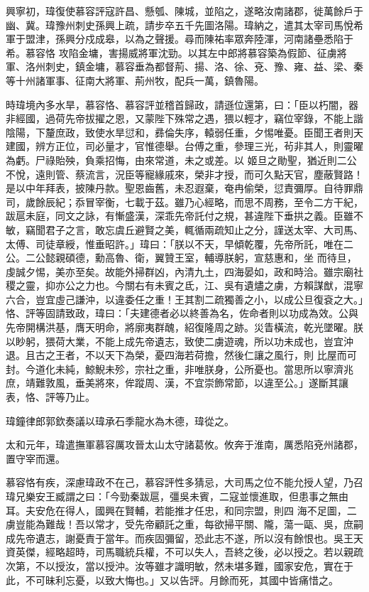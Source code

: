 \begin{pinyinscope}
 興寧初，瑋復使慕容評寇許昌、懸瓠、陳城，並陷之，遂略汝南諸郡，徙萬餘戶于幽、冀。瑋豫州刺史孫興上疏，請步卒五千先圖洛陽。瑋納之，遣其太宰司馬悅希軍于盟津，孫興分戍成皋，以為之聲援。尋而陳祐率眾奔陸渾，河南諸壘悉陷于希。慕容恪
 攻陷金墉，害揚威將軍沈勁。以其左中郎將慕容築為假節、征虜將軍、洛州刺史，鎮金墉，慕容垂為都督荊、揚、洛、徐、兗、豫、雍、益、梁、秦等十州諸軍事、征南大將軍、荊州牧，配兵一萬，鎮魯陽。



 時瑋境內多水旱，慕容恪、慕容評並稽首歸政，請遜位還第，曰：「臣以朽闇，器非經國，過荷先帝拔擢之恩，又蒙陛下殊常之遇，猥以輕才，竊位宰錄，不能上諧陰陽，下釐庶政，致使水旱愆和，彞倫失序，轅弱任重，夕惕唯憂。臣聞王者則天建國，辨方正位，司必量才，官惟德舉。台傅之重，參理三光，茍非其人，則靈曜為虧。尸祿貽殃，負乘招悔，由來常道，未之或差。以
 姬旦之勛聖，猶近則二公不悅，遠則管、蔡流言，況臣等寵緣戚來，榮非才授，而可久點天官，塵蔽賢路！是以中年拜表，披陳丹款。聖恩齒舊，未忍遐棄，奄冉偷榮，愆責彌厚。自待罪鼎司，歲餘辰紀；忝冒宰衡，七載于茲。雖乃心經略，而思不周務，至令二方干紀，跋扈未庭，同文之詠，有慚盛漢，深乖先帝託付之規，甚違陛下垂拱之義。臣雖不敏，竊聞君子之言，敢忘虞丘避賢之美，輒循兩疏知止之分，謹送太宰、大司馬、太傅、司徒章綬，惟垂昭許。」瑋曰：「朕以不天，早傾乾覆，先帝所託，唯在二公。二公懿親碩德，勳高魯、衛，翼贊王室，輔導朕躬，宣慈惠和，坐
 而待旦，虔誠夕惕，美亦至矣。故能外掃群凶，內清九土，四海晏如，政和時洽。雖宗廟社稷之靈，抑亦公之力也。今關右有未賓之氐，江、吳有遺燼之虜，方賴謀猷，混寧六合，豈宜虛己謙沖，以違委任之重！王其割二疏獨善之小，以成公旦復袞之大。」恪、評等固請致政，瑋曰：「夫建德者必以終善為名，佐命者則以功成為效。公與先帝開構洪基，膺天明命，將廓夷群醜，紹復隆周之跡。災眚橫流，乾光墜曜。朕以眇躬，猥荷大業，不能上成先帝遺志，致使二虜遊魂，所以功未成也，豈宜沖退。且古之王者，不以天下為榮，憂四海若荷擔，然後仁讓之風行，則
 比屋而可封。今道化未純，鯨鯢未殄，宗社之重，非唯朕身，公所憂也。當思所以寧濟兆庶，靖難敦風，垂美將來，侔蹤周、漢，不宜崇飾常節，以違至公。」遂斷其讓表，恪、評等乃止。



 瑋鐘律郎郭欽奏議以瑋承石季龍水為木德，瑋從之。



 太和元年，瑋遣撫軍慕容厲攻晉太山太守諸葛攸。攸奔于淮南，厲悉陷兗州諸郡，置守宰而還。



 慕容恪有疾，深慮瑋政不在己，慕容評性多猜忌，大司馬之位不能允授人望，乃召瑋兄樂安王臧謂之曰：「今勁秦跋扈，彊吳未賓，二寇並懷進取，但患事之無由耳。夫安危在得人，國興在賢輔，若能推才任忠，和同宗盟，則四
 海不足圖，二虜豈能為難哉！吾以常才，受先帝顧託之重，每欲掃平關、隴，蕩一甌、吳，庶嗣成先帝遺志，謝憂責于當年。而疾固彌留，恐此志不遂，所以沒有餘恨也。吳王天資英傑，經略超時，司馬職統兵權，不可以失人，吾終之後，必以授之。若以親疏次第，不以授汝，當以授沖。汝等雖才識明敏，然未堪多難，國家安危，實在于此，不可昧利忘憂，以致大悔也。」又以告評。月餘而死，其國中皆痛惜之。




\end{pinyinscope}
